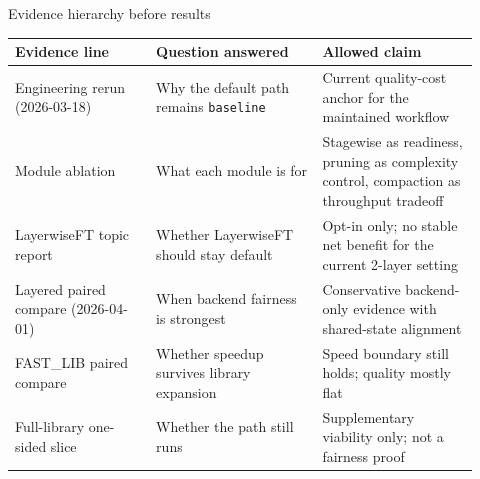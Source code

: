 \documentclass[aspectratio=169,10pt]{beamer}
\begin{document}
\begin{frame}{Evidence hierarchy before results}
  \small
  \begin{tabular}{>{\raggedright\arraybackslash}p{0.28\linewidth} >{\raggedright\arraybackslash}p{0.33\linewidth} >{\raggedright\arraybackslash}p{0.31\linewidth}}
    \toprule
    \textbf{Evidence line} & \textbf{Question answered} & \textbf{Allowed claim} \\
    \midrule
    Engineering rerun (2026-03-18) & Why the default path remains \texttt{baseline} & Current quality-cost anchor for the maintained workflow \\
    Module ablation & What each module is for & Stagewise as readiness, pruning as complexity control, compaction as throughput tradeoff \\
    LayerwiseFT topic report & Whether LayerwiseFT should stay default & Opt-in only; no stable net benefit for the current 2-layer setting \\
    Layered paired compare (2026-04-01) & When backend fairness is strongest & Conservative backend-only evidence with shared-state alignment \\
    FAST\_LIB paired compare & Whether speedup survives library expansion & Speed boundary still holds; quality mostly flat \\
    Full-library one-sided slice & Whether the path still runs & Supplementary viability only; not a fairness proof \\
    \bottomrule
  \end{tabular}
  \vspace{0.4cm}
\end{frame}
\end{document}
